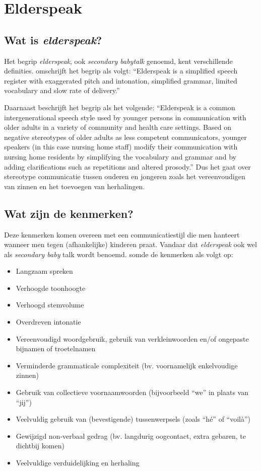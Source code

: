 \section{Elderspeak}

\subsection{Wat is \textit{elderspeak}?}

Het begrip \textit{elderspeak}, ook \textit{secondary babytalk} genoemd, kent verschillende definities. \textcite{Kemper1998} omschrijft het begrip als volgt:
``Elderspeak is a simplified speech register with exaggerated pitch and intonation, simplified grammar, limited vocabulary and slow rate of delivery.''

Daarnaast beschrijft \textcite{Williams2011} het begrip als het volgende:
``Elderspeak is a common intergenerational speech style used by younger persons in communication with older adults in a variety of community and health care settings. Based on negative stereotypes of older adults as less competent communicators, younger speakers (in this case nursing home staff) modify their communication with nursing home residents by simplifying the vocabulary and grammar and by adding clarifications such as repetitions and altered prosody.'' Dus het gaat over stereotype communicatie tussen ouderen en jongeren zoals het vereenvoudigen van zinnen en het toevoegen van herhalingen.

\subsection{Wat zijn de kenmerken?}
Deze kenmerken komen overeen met een communicatiestijl die men hanteert wanneer men tegen (afhankelijke) kinderen praat. Vandaar dat \textit{elderspeak} ook wel als \textit{secondary baby} talk wordt benoemd. \textcite{Campens2021} somde de kenmerken als volgt op:

\begin{itemize}
    \item Langzaam spreken
    \item Verhoogde toonhoogte
    \item Verhoogd stemvolume
    \item Overdreven intonatie
    \item Vereenvoudigd woordgebruik, gebruik van verkleinwoorden en/of ongepaste bijnamen of troetelnamen
    \item Verminderde grammaticale complexiteit (bv. voornamelijk enkelvoudige zinnen)
    \item Gebruik van collectieve voornaamwoorden (bijvoorbeeld ``we'' in plaats van ``jij'')
    \item Veelvuldig gebruik van (bevestigende) tussenwerpsels (zoals ``hé'' of ``voilà'')
    \item Gewijzigd non-verbaal gedrag (bv. langdurig oogcontact, extra gebaren, te dichtbij komen)
    \item Veelvuldige verduidelijking en herhaling
\end{itemize}

